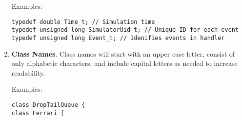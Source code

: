 \documentclass[11pt]{article}
\begin{document}
\begin{enumerate}
Examples:

{\tt typedef double         Time\_t;         // Simulation time}\\
{\tt typedef unsigned long  SimulatorUid\_t; // Unique ID for each event}\\
{\tt typedef unsigned long  Event\_t;        // Idenifies events in handler}\\

\item {\bf Class Names}.  Class names will start with an upper case letter,
consist of only alphabetic characters, and include capital letters as 
needed to increase readability.

Examples:

{\tt class DropTailQueue \{}\\
{\tt class Ferrari \{}\\

\end{enumerate}

\end{document}
